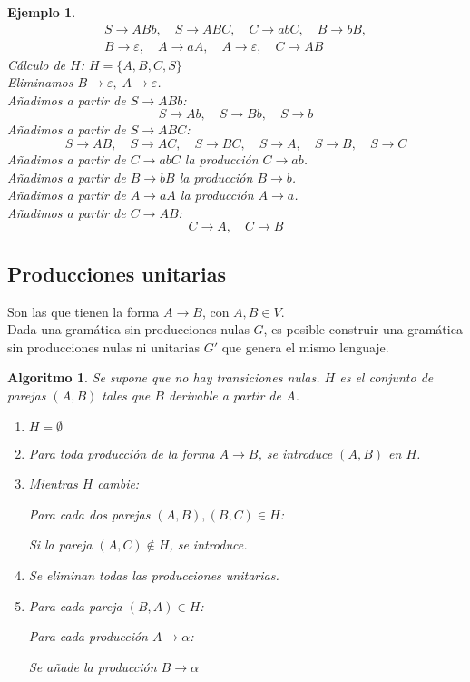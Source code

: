 \documentclass[11pt,titlepage,a4paper]{article}
\theoremstyle{ejemplo}
\newtheorem*{eje}{Ejemplo} %
\theoremstyle{algoritmo}
\newtheorem*{alg}{Algoritmo} %
\begin{document}
\begin{eje}
\begin{gather*}
S\to ABb,\quad S\to ABC,\quad C\to abC,\quad B\to bB, \\
% 
B\to\varepsilon,\quad A\to aA,\quad A\to\varepsilon,\quad C\to AB
\end{gather*}
Cálculo de $H$: $H=\{A,B,C,S\}$\\
Eliminamos $B\to\varepsilon,\;A\to\varepsilon$.\\
Añadimos a partir de $S\to ABb$:
$$S\to Ab,\quad S\to Bb,\quad S\to b$$
Añadimos a partir de $S\to ABC$:
$$S\to AB,\quad S\to AC,\quad S\to BC,\quad S\to A,\quad S\to B,\quad S\to C$$
Añadimos a partir de $C\to abC$ la producción $C\to ab$.\\
Añadimos a partir de $B\to bB$ la producción $B\to b$.\\
Añadimos a partir de $A\to aA$ la producción $A\to a$.\\
Añadimos a partir de $C\to AB$:
$$C\to A,\quad C\to B$$
\end{eje}

\subsection{Producciones unitarias}

Son las que tienen la forma $A\to B$, con $A,B\in V$.
\\

Dada una gramática sin producciones nulas $G$, es posible construir una 
gramática sin producciones nulas ni unitarias $G'$ que genera el mismo lenguaje.

\begin{alg}
Se supone que no hay transiciones nulas. $H$ es el conjunto de parejas $(A,B)$ 
tales que $B$ derivable a partir de $A$.
\begin{enumerate}[noitemsep]
	\item $H=\emptyset$
	\item Para toda producción de la forma $A\to B$, se introduce $(A,B)$ en 
	$H$.
	\item Mientras $H$ cambie:
	
	\quad\quad Para cada dos parejas $(A,B),(B,C)\in H$:
	
	\quad\quad\quad\quad Si la pareja $(A,C)\notin H$, se introduce.
	\item Se eliminan todas las producciones unitarias.
	\item Para cada pareja $(B,A)\in H$:
	
	\quad\quad Para cada producción $A\to\alpha$:
	
	\quad\quad\quad\quad Se añade la producción $B\to\alpha$
\end{enumerate}
\end{alg}
\end{document}

